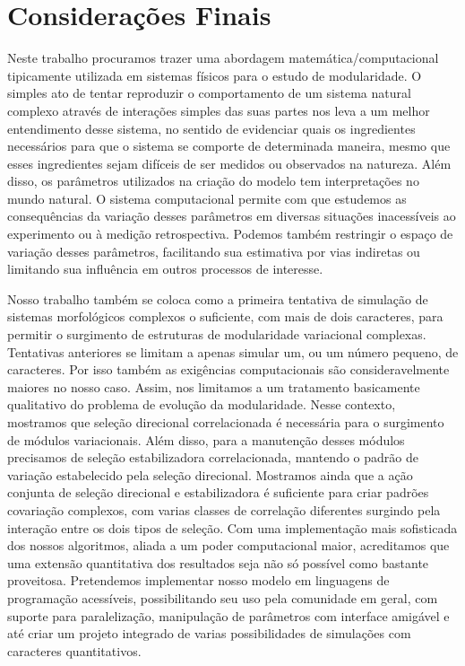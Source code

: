 \pagestyle{empty}
\cleardoublepage
\pagestyle{fancy}
\chapter{Considerações Finais}
\label{cap5}

Neste trabalho procuramos trazer uma abordagem matemática/computacional
tipicamente utilizada em sistemas físicos para o estudo de
modularidade. 
O simples ato de tentar reproduzir o comportamento de um sistema natural
complexo através de interações simples das suas partes nos leva a um melhor
entendimento desse sistema, no sentido de evidenciar quais os
ingredientes necessários para que o sistema se comporte de determinada
maneira, mesmo que esses ingredientes sejam difíceis de ser medidos ou
observados na natureza. 
Além disso, os parâmetros utilizados na criação do modelo tem
interpretações no mundo natural. 
O sistema computacional permite com que estudemos as consequências da
variação desses parâmetros em diversas situações inacessíveis ao
experimento ou à medição retrospectiva. 
Podemos também restringir o espaço de variação desses parâmetros,
facilitando sua estimativa por vias indiretas ou limitando sua
influência em outros processos de interesse. 

Nosso trabalho também se coloca como a primeira tentativa de simulação
de sistemas morfológicos complexos o suficiente, com mais de dois
caracteres, para permitir o surgimento de estruturas de modularidade
variacional complexas. 
Tentativas anteriores se limitam a apenas simular um, ou um número
pequeno, de caracteres. 
Por isso também as exigências computacionais são consideravelmente
maiores no nosso caso. 
Assim, nos limitamos a um tratamento basicamente qualitativo do problema
de evolução da modularidade. 
Nesse contexto, mostramos que seleção direcional correlacionada é
necessária para o surgimento de módulos variacionais. 
Além disso, para a manutenção desses módulos precisamos de seleção
estabilizadora correlacionada, mantendo o padrão de variação
estabelecido pela seleção direcional.
Mostramos ainda que a ação conjunta de seleção direcional e
estabilizadora é suficiente para criar padrões covariação complexos, com
varias classes de correlação diferentes surgindo pela interação entre
os dois tipos de seleção.
Com uma implementação mais sofisticada dos
nossos algoritmos, aliada a um poder computacional maior, acreditamos
que uma extensão quantitativa dos resultados seja não só possível como
bastante proveitosa. 
Pretendemos implementar nosso modelo em linguagens de programação
acessíveis, possibilitando seu uso pela comunidade em geral, com suporte
para paralelização, manipulação de parâmetros com interface amigável e
até criar um projeto integrado de varias possibilidades de simulações
com caracteres quantitativos.

